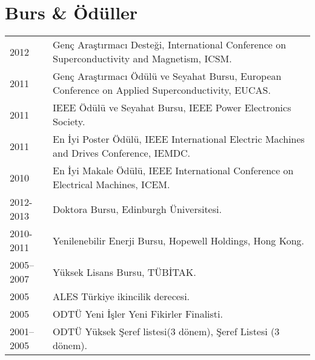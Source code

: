 \documentclass[a4paper,12pt]{article}
\begin{document}
\section{Burs \& Ödüller}
\begin{tabular}{lp{16cm}}
2012 & Genç Araştırmacı Desteği, International Conference on Superconductivity and Magnetism, ICSM.\\ 
2011 & Genç Araştırmacı Ödülü ve Seyahat Bursu, European Conference on Applied Superconductivity, EUCAS. \\ 
2011 & IEEE Ödülü ve Seyahat Bursu, IEEE Power Electronics Society.\\ 
2011 & En İyi Poster Ödülü, IEEE International Electric Machines and Drives Conference, IEMDC.\\
2010 & En İyi Makale Ödülü, IEEE International Conference on Electrical Machines, ICEM. \\
2012-2013 & Doktora Bursu, Edinburgh Üniversitesi. \\
2010-2011 & Yenilenebilir Enerji Bursu, Hopewell Holdings, Hong Kong. \\
2005--2007 & Yüksek Lisans Bursu, TÜBİTAK. \\
2005 & ALES Türkiye ikincilik derecesi.\\
2005 & ODTÜ Yeni İşler Yeni Fikirler Finalisti.\\
2001--2005 & ODTÜ Yüksek Şeref listesi(3 dönem), Şeref Listesi (3 dönem). \\
\end{tabular}
\end{document}
